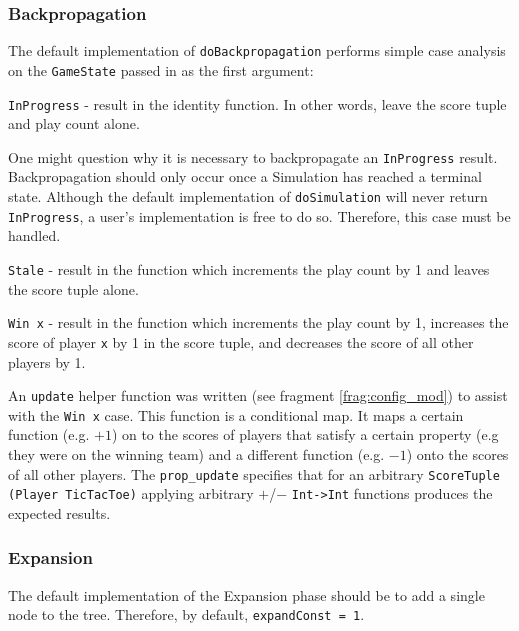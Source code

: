 \subsubsection{Backpropagation}
The default implementation of \texttt{doBackpropagation} performs simple case analysis on the \texttt{GameState} passed in as the first argument:
\begin{list}{}{}
\item \verb|InProgress| - result in the identity function. In other words, leave the score tuple and play count alone.\par One might question why it is necessary to {backpropagate} an \verb|InProgress| result. {Backpropagation} should only occur once a Simulation has reached a terminal state. Although the default implementation of \verb|doSimulation| will never return \verb|InProgress|, a user's implementation is free to do so. Therefore, this case must be handled.
\item \verb|Stale| - result in the function which increments the play count by 1 and leaves the score tuple alone.
\item \verb|Win x| - result in the function which increments the play count by 1, increases the score of player \verb|x| by 1 in the score tuple, and decreases the score of all other players by 1. 
\end{list}
An \verb|update| helper function was written (see fragment \ref{frag:config_mod}) to assist with the \verb|Win x| case. This function is a conditional map. It maps a certain function (e.g. $+1$) on to the scores of players that satisfy a certain property (e.g they were on the winning team) and a different function (e.g. $-1$) onto the scores of all other players. The \verb|prop_update| specifies that for an arbitrary \texttt{ScoreTuple (Player TicTacToe)} applying arbitrary $+$/$-$ \texttt{Int->Int} functions produces the expected results.


\subsubsection{Expansion}
The default implementation of the Expansion phase should be to add a single node to the tree. Therefore, by default, \verb|expandConst = 1|.



